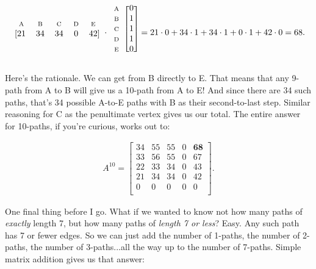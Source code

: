 \begin{alttitles}
\[
\begin{blockarray}{ccccc}
{\scriptsize\textrm{A}} & {\scriptsize\textrm{B}} & {\scriptsize\textrm{C}} & {\scriptsize\textrm{D}} & {\scriptsize\textrm{E}} \\
\begin{block}{[ccccc]}
 21 & 34 & 34 & 0 & 42 \\
\end{block}
\end{blockarray} \cdot
\begin{blockarray}{cc}
\begin{block}{c[c]}
{\scriptsize\textrm{A}} & 0 \\
{\scriptsize\textrm{B}} & 1 \\
{\scriptsize\textrm{C}} & 1 \\
{\scriptsize\textrm{D}} & 1 \\
{\scriptsize\textrm{E}} & 0 \\
\end{block}
\end{blockarray} = 21\cdot 0 + 34\cdot 1 + 34\cdot 1 + 0\cdot 1 + 42\cdot 0 =
68.
\]
\vspace{-.20in}

Here's the rationale. We can get from B directly to E. That means that any
9-path from A to B will give us a 10-path from A to E! And since there are 34
such paths, that's 34 possible A-to-E paths with B as their second-to-last
step. Similar reasoning for C as the penultimate vertex gives us our total. The
entire answer for 10-paths, if you're curious, works out to:

\vspace{-.25in}
\begin{align*}
A^{10} =
\begin{bmatrix}
34 & 55 & 55 &  0 & \textbf{68} \\
33 & 56 & 55 &  0 & 67 \\
22 & 33 & 34 &  0 & 43 \\
21 & 34 & 34 &  0 & 42 \\
 0 &  0 &  0 &  0 &  0 \\
\end{bmatrix}.
\end{align*}
\vspace{-.15in}

\bigskip

One final thing before I go. What if we wanted to know not how many paths of
\textit{exactly} length 7, but how many paths of \textit{length 7 or less}?
Easy. Any such path has 7 or fewer edges. So we can just add the number of
1-paths, the number of 2-paths, the number of 3-paths...all the way up to the
number of 7-paths. Simple matrix addition gives us that answer:


\end{alttitles}
